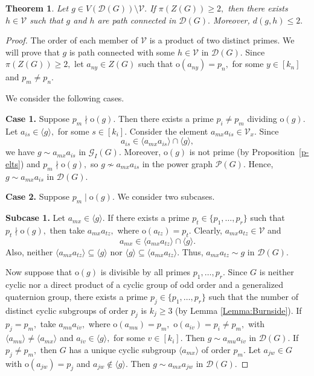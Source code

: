 \documentclass[12pt]{amsart}
\theoremstyle{plain}
\newtheorem{theorem}{Theorem}[section]
\theoremstyle{remark}
\theoremstyle{definition}
\begin{document}
\begin{theorem}\label{t:pconn3}  
Let $g \in V(\mathcal{D}(G)) \setminus \mathcal{V}.$ If $\pi(Z(G)) \geq 2,$ then there exists $h \in \mathcal{V}$ such that $g$ and $h$ are path connected in $\mathcal{D}(G).$ Moreover, $d(g,h) \leq 2.$  
\end{theorem}

\begin{proof}
The order of each member of $\mathcal{V}$ is a product of two distinct primes.  
We will prove that $g$ is path connected with some $h \in \mathcal{V}$ in $\mathcal{D}(G).$  
Since $\pi(Z(G)) \geq 2,$ let $a_{ny} \in Z(G)$ such that $\mathrm{o}(a_{ny}) = p_n,$ for some $y \in [k_n]$ and $p_m \neq p_n.$  

We consider the following cases.

\medskip
\noindent
\textbf{Case 1.} Suppose $p_m \nmid \mathrm{o}(g).$  
Then there exists a prime $p_i \neq p_m$ dividing $\mathrm{o}(g).$  
Let $a_{is} \in \langle g \rangle,$ for some $s \in [k_i].$  
Consider the element $a_{mx}a_{is} \in \mathcal{V}_x.$  
Since 
\[
a_{is} \in \langle a_{mx}a_{is} \rangle \cap \langle g \rangle,
\]
we have $g \sim a_{mx}a_{is}$ in $\mathcal{G}_I(G).$  
Moreover, $\mathrm{o}(g)$ is not prime (by Proposition~\ref{p-elts}) and $p_m \nmid \mathrm{o}(g),$ so $g \nsim a_{mx}a_{is}$ in the power graph $\mathcal{P}(G).$  
Hence, $g \sim a_{mx}a_{is}$ in $\mathcal{D}(G).$

\medskip
\noindent
\textbf{Case 2.} Suppose $p_m \mid \mathrm{o}(g).$  
We consider two subcases.

\smallskip
\textbf{Subcase 1.} Let $a_{mx} \in \langle g \rangle.$  
If there exists a prime $p_t \in \{p_1,\dots, p_r\}$ such that $p_t \nmid \mathrm{o}(g),$ then take $a_{mx}a_{tz},$ where $\mathrm{o}(a_{tz}) = p_t.$  
Clearly, $a_{mx}a_{tz} \in \mathcal{V}$ and 
\[
a_{mx} \in \langle a_{mx}a_{tz} \rangle \cap \langle g \rangle.
\]
Also, neither $\langle a_{mx}a_{tz} \rangle \subseteq \langle g \rangle$ nor $\langle g \rangle \subseteq \langle a_{mx}a_{tz} \rangle.$  
Thus, $a_{mx}a_{tz} \sim g$ in $\mathcal{D}(G).$  

Now suppose that $\mathrm{o}(g)$ is divisible by all primes $p_1,\dots, p_r.$  
Since $G$ is neither cyclic nor a direct product of a cyclic group of odd order and a generalized quaternion group, there exists a prime $p_j \in \{p_1,\dots,p_r\}$ such that the number of distinct cyclic subgroups of order $p_j$ is $k_j \geq 3$ (by Lemma \ref{Lemma:Burnside}). If $p_j = p_m,$ take $a_{mu}a_{iv},$ where $\mathrm{o}(a_{mu}) = p_m,$ $\mathrm{o}(a_{iv}) = p_i \neq p_m,$ with $\langle a_{mu} \rangle \neq \langle a_{mx} \rangle$ and $a_{iv} \in \langle g \rangle,$ for some $v \in [k_i].$  
Then $g \sim a_{mu}a_{iv}$ in $\mathcal{D}(G).$ If $p_j \neq p_m,$ then $G$ has a unique cyclic subgroup $\langle a_{mx} \rangle$ of order $p_m.$  
Let $a_{jw} \in G$ with $\mathrm{o}(a_{jw}) = p_j$ and $a_{jw} \notin \langle g \rangle.$  
Then $g \sim a_{mx}a_{jw}$ in $\mathcal{D}(G).$


\end{proof}
\end{document}
